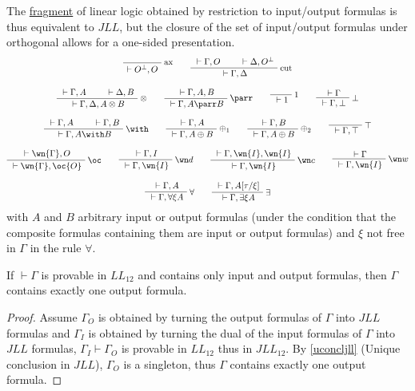The \hyperref[fragment]{fragment} of linear logic obtained by restriction to
input/output formulas is thus equivalent to \(JLL\), but the closure of
the set of input/output formulas under orthogonal allows for a one-sided
presentation.
\begin{gather*}
\LabelRule{\rulename{ax}}
\NulRule{\vdash O\orth,O}
\DisplayProof
\qquad
\AxRule{{}\vdash \Gamma,O}
\AxRule{{}\vdash\Delta,O\orth}
\LabelRule{\rulename{cut}}
\BinRule{{}\vdash\Gamma,\Delta}
\DisplayProof
\\[2ex]
\AxRule{{}\vdash\Gamma,A}
\AxRule{{}\vdash\Delta,B}
\LabelRule{\tens}
\BinRule{{}\vdash\Gamma,\Delta,A\tens B}
\DisplayProof
\qquad
\AxRule{{}\vdash\Gamma,A,B}
\LabelRule{\parr}
\UnaRule{{}\vdash\Gamma,A\parr B}
\DisplayProof
\qquad
\LabelRule{\one}
\NulRule{{}\vdash\one}
\DisplayProof
\qquad
\AxRule{{}\vdash\Gamma}
\LabelRule{\bot}
\UnaRule{{}\vdash\Gamma,\bot}
\DisplayProof
\\[2ex]
\AxRule{{}\vdash\Gamma,A}
\AxRule{{}\vdash\Gamma,B}
\LabelRule{\with}
\BinRule{{}\vdash\Gamma,A\with B}
\DisplayProof
\qquad
\AxRule{{}\vdash\Gamma,A}
\LabelRule{\plus_1}
\UnaRule{{}\vdash\Gamma,A\plus B}
\DisplayProof
\qquad
\AxRule{{}\vdash\Gamma,B}
\LabelRule{\plus_2}
\UnaRule{{}\vdash\Gamma,A\plus B}
\DisplayProof
\qquad
\LabelRule{\top}
\NulRule{{}\vdash\Gamma,\top}
\DisplayProof
\\[2ex]
\AxRule{{}\vdash\wn{\Gamma},O}
\LabelRule{\oc}
\UnaRule{{}\vdash\wn{\Gamma},\oc{O}}
\DisplayProof
\qquad
\AxRule{{}\vdash\Gamma,I}
\LabelRule{\wn d}
\UnaRule{{}\vdash\Gamma,\wn{I}}
\DisplayProof
\qquad
\AxRule{{}\vdash\Gamma,\wn{I},\wn{I}}
\LabelRule{\wn c}
\UnaRule{{}\vdash\Gamma,\wn{I}}
\DisplayProof
\qquad
\AxRule{{}\vdash\Gamma}
\LabelRule{\wn w}
\UnaRule{{}\vdash\Gamma,\wn{I}}
\DisplayProof
\\[2ex]
\AxRule{{}\vdash\Gamma,A}
\LabelRule{\forall}
\UnaRule{{}\vdash\Gamma,\forall\xi A}
\DisplayProof
\qquad
\AxRule{{}\vdash\Gamma,A[\tau/\xi]}
\LabelRule{\exists}
\UnaRule{{}\vdash\Gamma,\exists\xi A}
\DisplayProof
\end{gather*}
with \(A\) and \(B\) arbitrary input or output formulas (under the
condition that the composite formulas containing them are input or
output formulas) and \(\xi\) not free in \(\Gamma\) in the rule
\(\forall\).

\begin{lemma}
If ${}\vdash\Gamma$ is provable in $LL_{12}$ and contains only input and output formulas, then $\Gamma$ contains exactly one output formula.
\end{lemma}

\begin{proof}
Assume $\Gamma_O$ is obtained by turning the output formulas of $\Gamma$ into $JLL$ formulas and $\Gamma_I$ is obtained by turning the dual of the input formulas of $\Gamma$ into $JLL$ formulas, $\Gamma_I\vdash\Gamma_O$ is provable in $LL_{12}$ thus in $JLL_{12}$. By \cref{uconcljll} (Unique conclusion in $JLL$), $\Gamma_O$ is a singleton, thus $\Gamma$ contains exactly one output formula.
\end{proof}


